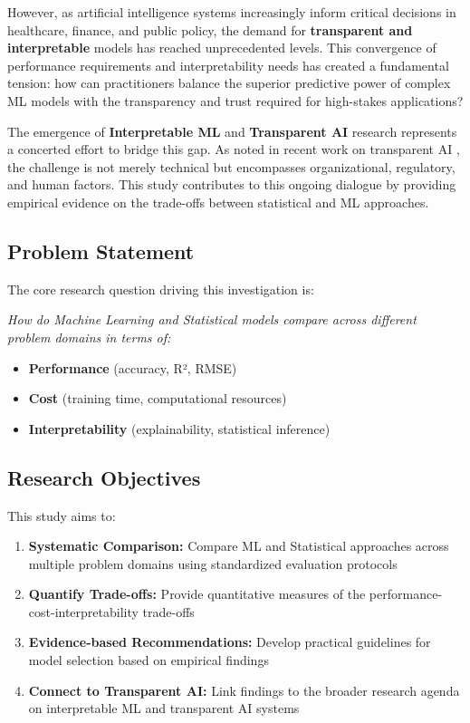 \documentclass[11pt,a4paper]{article}
\begin{document}
However, as artificial intelligence systems increasingly inform critical decisions in healthcare, finance, and public policy, the demand for \textbf{transparent and interpretable} models has reached unprecedented levels. This convergence of performance requirements and interpretability needs has created a fundamental tension: how can practitioners balance the superior predictive power of complex ML models with the transparency and trust required for high-stakes applications?

The emergence of \textbf{Interpretable ML} and \textbf{Transparent AI} research represents a concerted effort to bridge this gap. As noted in recent work on transparent AI \cite{transparent_ai_2025}, the challenge is not merely technical but encompasses organizational, regulatory, and human factors. This study contributes to this ongoing dialogue by providing empirical evidence on the trade-offs between statistical and ML approaches.

\subsection{Problem Statement}

The core research question driving this investigation is:

\textit{How do Machine Learning and Statistical models compare across different problem domains in terms of:}
\begin{itemize}
    \item \textcolor{mlcolor}{\textbf{Performance}} (accuracy, R², RMSE)
    \item \textcolor{statcolor}{\textbf{Cost}} (training time, computational resources)
    \item \textcolor{accentcolor}{\textbf{Interpretability}} (explainability, statistical inference)
\end{itemize}
\subsection{Research Objectives}

This study aims to:

\begin{enumerate}
    \item \textbf{Systematic Comparison:} Compare ML and Statistical approaches across multiple problem domains using standardized evaluation protocols
    \item \textbf{Quantify Trade-offs:} Provide quantitative measures of the performance-cost-interpretability trade-offs
    \item \textbf{Evidence-based Recommendations:} Develop practical guidelines for model selection based on empirical findings
    \item \textbf{Connect to Transparent AI:} Link findings to the broader research agenda on interpretable ML and transparent AI systems
\end{enumerate}
\end{document}
